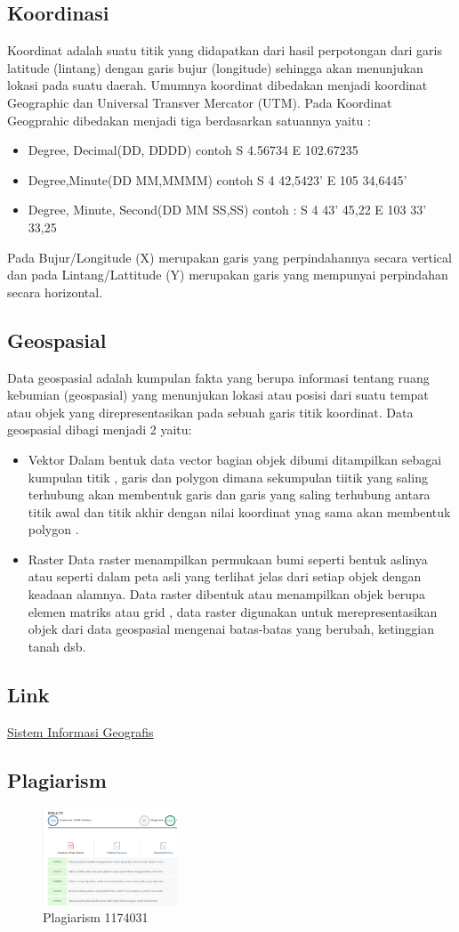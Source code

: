 \subsection{Koordinasi}
Koordinat adalah suatu titik yang didapatkan dari hasil perpotongan dari garis latitude (lintang) dengan garis bujur (longitude) sehingga akan menunjukan lokasi pada suatu daerah. Umumnya koordinat dibedakan menjadi koordinat Geographic dan Universal Transver Mercator (UTM). Pada Koordinat Geogprahic dibedakan menjadi tiga berdasarkan satuannya yaitu :
\begin{itemize}
	\item Degree, Decimal(DD, DDDD) contoh S 4.56734 E 102.67235
	\item Degree,Minute(DD MM,MMMM) contoh S 4 42,5423’ E 105 34,6445’
	\item Degree, Minute, Second(DD MM SS,SS) contoh : S 4 43’ 45,22 E 103 33’ 33,25
\end{itemize}
Pada Bujur/Longitude (X) merupakan garis yang perpindahannya secara vertical dan pada Lintang/Lattitude (Y) merupakan garis yang mempunyai perpindahan secara horizontal.

\subsection{Geospasial}
Data geospasial adalah kumpulan fakta yang berupa informasi tentang ruang kebumian (geospasial) yang menunjukan lokasi atau posisi dari suatu tempat atau objek yang direpresentasikan pada sebuah garis titik koordinat. Data geospasial dibagi menjadi 2 yaitu:
\begin{itemize}
	\item Vektor
	Dalam bentuk data vector bagian objek dibumi ditampilkan sebagai kumpulan titik , garis dan polygon dimana sekumpulan tiitik yang saling terhubung akan membentuk garis dan garis yang saling terhubung antara titik awal dan titik akhir dengan nilai koordinat ynag sama akan membentuk polygon . 

	\item Raster
	Data raster menampilkan permukaan bumi seperti bentuk aslinya atau seperti dalam peta asli yang terlihat jelas dari setiap objek dengan keadaan alamnya. Data raster dibentuk atau menampilkan objek berupa elemen matriks atau grid , data raster digunakan untuk merepresentasikan objek dari data geospasial mengenai batas-batas yang berubah, ketinggian tanah dsb.
\end{itemize}


\subsection{Link}
\href{https://youtu.be/oJ2smVdIph4}{Sistem Informasi Geografis}

\subsection{Plagiarism}
\begin{figure}[H]
	\includegraphics[width=4cm]{figures/1174031/plagiat.png}
	\centering
	\caption{Plagiarism 1174031}
\end{figure}
